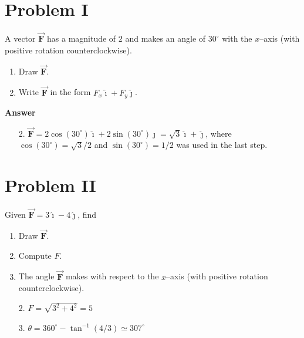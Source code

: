 \documentclass{article}
\newcommand{\ihat}[0]{\hat{\boldsymbol{\imath}}}
\newcommand{\jhat}[0]{\hat{\boldsymbol{\jmath}}}
\newcommand{\bfvec}[1]{\vec{\mathbf{#1}}}
\begin{document}
\section{Problem I}

A vector $\bfvec{F}$ has a magnitude of $2$ and makes an angle of $30^\circ$ with the $x$--axis (with positive rotation counterclockwise).

\begin{enumerate}

  \item Draw $\bfvec{F}$.

  \item Write $\bfvec{F}$ in the form $F_x\ihat + F_y\jhat$.

\end{enumerate}

\ifsolutions
\textbf{Answer}

    \begin{enumerate}

      \item[2.] $\bfvec{F} = 2\cos(30^\circ)\ihat + 2\sin(30^\circ)\jhat=\sqrt{3}\ihat + \jhat$, where $\cos(30^\circ)=\sqrt{3}/2$ and $\sin(30^\circ)=1/2$ was used in the last step.

    \end{enumerate}
\else


\fi

\section{Problem II}

Given $\bfvec{F}=3\ihat -4\jhat$, find

\begin{enumerate}

  \item Draw $\bfvec{F}$.

  \item Compute $F$.

  \item The angle  $\bfvec{F}$ makes with respect to the $x$--axis (with positive rotation counterclockwise).

\end{enumerate}

\ifsolutions
    \begin{enumerate}

      \item[2.] $F=\sqrt{3^2+4^2}=5$

      \item[3.] $\theta = 360^\circ - \tan^{-1}(4/3)\simeq 307^\circ$

    \end{enumerate}
\else


\fi
\end{document}
